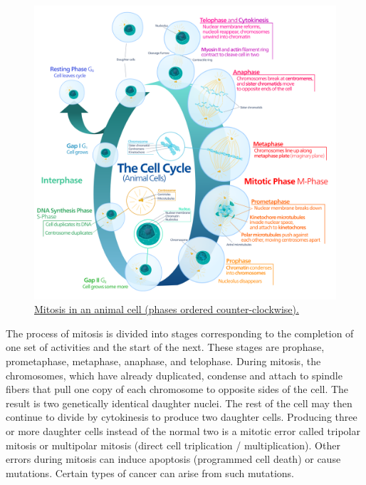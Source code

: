 \begin{figure}

{\centering \includegraphics[width=0.7\linewidth]{./figures/reproduction/Animal_cell_cycle-en} 

}

\caption{\href{https://commons.wikimedia.org/wiki/File:Animal_cell_cycle-en.svg}{Mitosis in an animal cell (phases ordered counter-clockwise).}}\label{fig:cellcycle}
\end{figure}

The process of mitosis is divided into stages corresponding to the completion of one set of activities and the start of the next. These stages are prophase, prometaphase, metaphase, anaphase, and telophase. During mitosis, the chromosomes, which have already duplicated, condense and attach to spindle fibers that pull one copy of each chromosome to opposite sides of the cell. The result is two genetically identical daughter nuclei. The rest of the cell may then continue to divide by cytokinesis to produce two daughter cells. Producing three or more daughter cells instead of the normal two is a mitotic error called tripolar mitosis or multipolar mitosis (direct cell triplication / multiplication). Other errors during mitosis can induce apoptosis (programmed cell death) or cause mutations. Certain types of cancer can arise from such mutations.



